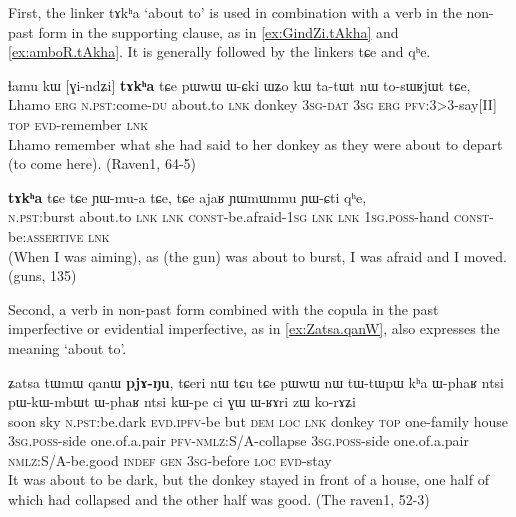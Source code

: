 \documentclass[oldfontcommands,oneside,a4paper,11pt]{article}
\newcommand{\ipa}[1]{{\phon \mbox{#1}}} %
\begin{document}
First, the linker \ipa{tɤkʰa} `about to'  is used in combination with a verb in the non-past form in the supporting clause, as in \ref{ex:GindZi.tAkha} and \ref{ex:amboR.tAkha}. It is generally followed by the linkers \ipa{tɕe} and \ipa{qʰe}. 
     \begin{exe}
\ex \label{ex:GindZi.tAkha}
\gll
\ipa{ɬamu}   	\ipa{kɯ}   	[\ipa{ɣi-ndʑi}]   	\textbf{\ipa{tɤkʰa}}   	\ipa{tɕe}   	\ipa{pɯwɯ}   	\ipa{ɯ-ɕki}   	\ipa{ɯʑo}   	\ipa{kɯ}   	\ipa{ta-tɯt}   	\ipa{nɯ}   	\ipa{to-sɯʁjɯt}   	\ipa{tɕe,}   	\\
Lhamo \textsc{erg} \textsc{n.pst}:come-\textsc{du} about.to \textsc{lnk} donkey \textsc{3sg-dat} \textsc{3sg} \textsc{erg} \textsc{pfv}:3>3-say[II] \textsc{top} \textsc{evd}-remember \textsc{lnk} \\
\glt  Lhamo remember what she had said to her donkey as they were about to depart (to come here). (Raven1, 64-5)
\end{exe}

     \begin{exe}
\ex \label{ex:amboR.tAkha}
\gll
[\ipa{amboʁ}]   	\textbf{\ipa{tɤkʰa}}   	\ipa{tɕe}   	\ipa{tɕe}   	\ipa{ɲɯ-mu-a}   	\ipa{tɕe,}   	\ipa{tɕe}   	\ipa{ajaʁ}   	\ipa{ɲɯmɯnmu}   	\ipa{ɲɯ-ɕti}   	\ipa{qʰe,}   \\
\textsc{n.pst}:burst  about.to \textsc{lnk}  \textsc{lnk} \textsc{const}-be.afraid-\textsc{1sg}  \textsc{lnk}  \textsc{lnk} \textsc{1sg.poss}-hand \textsc{const}-be:\textsc{assertive} \textsc{lnk} \\
\glt  (When I was aiming), as (the gun) was about to burst, I was afraid and I moved. (guns, 135)
\end{exe}




 
Second,  a verb in non-past form combined with the copula in the past imperfective or evidential imperfective, as in \ref{ex:Zatsa.qanW}, also expresses the meaning `about to'.
     \begin{exe}
\ex \label{ex:Zatsa.qanW}
\gll
\ipa{ʑatsa}  	\ipa{tɯmɯ}  	\ipa{qanɯ}  	\ipa{\textbf{pjɤ-ŋu},}  	\ipa{tɕeri}  	\ipa{nɯ} \ipa{tɕu}  	\ipa{tɕe}  	\ipa{pɯwɯ}  	\ipa{nɯ}  	\ipa{tɯ-tɯpɯ}  	\ipa{kʰa}  	\ipa{ɯ-phaʁ}  	\ipa{ntsi}  	\ipa{pɯ-kɯ-mbɯt}  	\ipa{ɯ-phaʁ}  	\ipa{ntsi}  	\ipa{kɯ-pe}  	\ipa{ci}  	\ipa{ɣɯ}   	\ipa{ɯ-ʁɤri}  	\ipa{zɯ}  	\ipa{ko-rɤʑi}  \\
soon sky \textsc{n.pst}:be.dark \textsc{evd.ipfv}-be but \textsc{dem} \textsc{loc} \textsc{lnk} donkey \textsc{top} one-family house \textsc{3sg.poss}-side one.of.a.pair \textsc{pfv-nmlz}:S/A-collapse  \textsc{3sg.poss}-side one.of.a.pair \textsc{nmlz}:S/A-be.good \textsc{indef}   \textsc{gen} \textsc{3sg}-before \textsc{loc} \textsc{evd}-stay \\
\glt It was about to be dark, but the donkey stayed in front of a house, one half of which had collapsed and the other half was good. (The raven1, 52-3)
 \end{exe}
\end{document}
